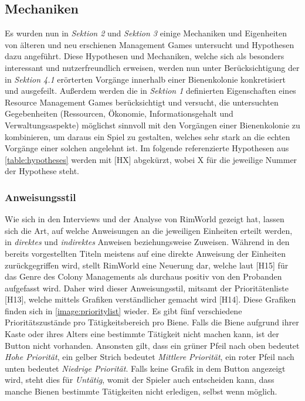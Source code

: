 \subsection{Mechaniken}
Es wurden nun in \textit{Sektion 2} und \textit{Sektion 3} einige Mechaniken und Eigenheiten von älteren und neu erschienen Management Games untersucht und Hypothesen dazu angeführt. Diese Hypothesen und Mechaniken, welche sich als besonders interessant und nutzerfreundlich erweisen, werden nun unter Berücksichtigung der in \textit{Sektion 4.1} erörterten Vorgänge innerhalb einer Bienenkolonie konkretisiert und ausgefeilt. Außerdem werden die in \textit{Sektion 1} definierten Eigenschaften eines Resource Management Games berücksichtigt und versucht, die untersuchten Gegebenheiten (Ressourcen, Ökonomie, Informationsgehalt und Verwaltungsaspekte) möglichst sinnvoll mit den Vorgängen einer Bienenkolonie zu kombinieren, um daraus ein Spiel zu gestalten, welches sehr stark an die echten Vorgänge einer solchen angelehnt ist. Im folgende referenzierte Hypothesen aus \autoref{table:hypotheses} werden mit [HX] abgekürzt, wobei X für die jeweilige Nummer der Hypothese steht.

\subsubsection{Anweisungsstil}
Wie sich in den Interviews und der Analyse von RimWorld gezeigt hat, lassen sich die Art, auf welche Anweisungen an die jeweiligen Einheiten erteilt werden, in \textit{direktes} und \textit{indirektes} Anweisen beziehungsweise Zuweisen. Während in den bereits vorgestellten Titeln meistens auf eine direkte Anweisung der Einheiten zurückgegriffen wird, stellt RimWorld eine Neuerung dar, welche laut [H15] für das Genre des Colony Managements als durchaus positiv von den Probanden aufgefasst wird. Daher wird dieser Anweisungsstil, mitsamt der Prioritätenliste [H13], welche mittels Grafiken verständlicher gemacht wird [H14]. Diese Grafiken finden sich in \autoref{image:prioritylist} wieder. Es gibt fünf verschiedene Prioritätszustände pro Tätigkeitsbereich pro Biene. Falls die Biene aufgrund ihrer Kaste oder ihres Alters eine bestimmte Tätigkeit nicht machen kann, ist der Button nicht vorhanden. Ansonsten gilt, dass ein grüner Pfeil nach oben bedeutet \textit{Hohe Priorität}, ein gelber Strich bedeutet \textit{Mittlere Priorität}, ein roter Pfeil nach unten bedeutet \textit{Niedrige Priorität}. Falls keine Grafik in dem Button angezeigt wird, steht dies für \textit{Untätig}, womit der Spieler auch entscheiden kann, dass manche Bienen bestimmte Tätigkeiten nicht erledigen, selbst wenn möglich.

